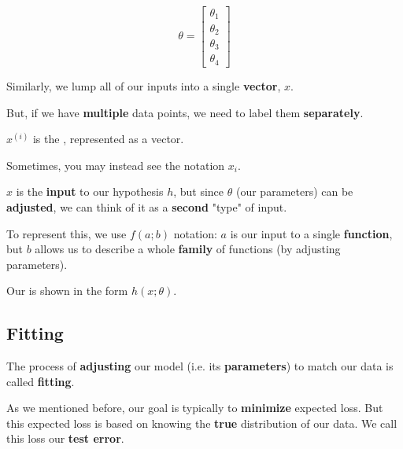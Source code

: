         \begin{equation}
            \theta =
                \begin{bmatrix}
                    \theta_1 \\ \theta_2 \\ \theta_3 \\ \theta_4
                \end{bmatrix}
        \end{equation}
        
        Similarly, we lump all of our inputs into a single \textbf{vector}, $x$. 
        
        
        But, if we have \textbf{multiple} data points, we need to label them \textbf{separately}.\\
        
        \begin{notation}
            $x^{(i)}$ is the , represented as a vector.
            
            Sometimes, you may instead see the notation $x_i$.
        \end{notation}
        
        $x$ is the \textbf{input} to our hypothesis $h$, but since $\theta$ (our parameters) can be \textbf{adjusted}, we can think of it as a \textbf{second} "type" of input.
        
        To represent this, we use $f(a;b)$ notation: $a$ is our input to a single \textbf{function}, but $b$ allows us to describe a whole \textbf{family} of functions (by adjusting parameters).\\
        
        \begin{notation}
            Our  is shown in the form $h(x;\theta)$.
        \end{notation}
        
        
    \subsection{Fitting}
    
        The process of \textbf{adjusting} our model (i.e. its \textbf{parameters}) to match our data is called \textbf{fitting}.
        
        As we mentioned before, our goal is typically to \textbf{minimize} expected loss. But this expected loss is based on knowing the \textbf{true} distribution of our data. We call this loss our \textbf{test error}.
        
